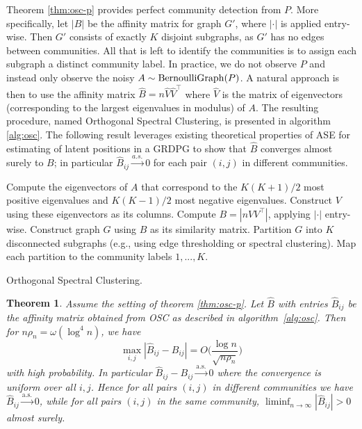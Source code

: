 \documentclass[
  11pt,
]{article}
\newtheorem{theorem}{Theorem}[section]
\theoremstyle{definition}
\theoremstyle{definition}
\theoremstyle{definition}
\theoremstyle{definition}
\theoremstyle{remark}
\begin{document}
Theorem \ref{thm:osc-p} provides perfect community detection from \(P\).
More specifically, let \(|B|\) be the affinity matrix for graph \(G'\),
where \(|\cdot|\) is applied entry-wise. Then
\(G'\) consists of exactly \(K\) disjoint subgraphs,
as \(G'\) has no edges between communities.
All that is left to identify the communities is
to assign each subgraph a distinct community label.
In practice, we do not observe \(P\) and instead only observe the noisy
\(A \sim \mathrm{BernoulliGraph}(P)\). A natural approach is then to use
the affinity matrix \(\hat{B} = n \hat{V} \hat{V}^{\top}\) where
\(\hat{V}\) is the matrix of eigenvectors (corresponding to the largest
eigenvalues in modulus) of \(A\). The resulting procedure, named
Orthogonal Spectral Clustering, is presented in
algorithm \ref{alg:osc}.
The following result leverages existing theoretical properties
of ASE for estimating of latent positions in a GRDPG \citep{rubindelanchy2017statistical} to show that
\(\hat{B}\) converges almost surely to \(B\); in particular
\(\hat{B}_{ij} \stackrel{a.s.}{\to} 0\)
for each pair \((i, j)\) in different communities.

\begin{algorithm}[tp]
  \label{alg:osc}
  \DontPrintSemicolon
  \SetAlgoLined
    Compute the eigenvectors of $A$ that correspond to the $K (K+1) / 2$ most
    positive eigenvalues and $K (K-1) / 2$ most negative eigenvalues. Construct
    $V$ using these eigenvectors as its columns.\;
    Compute $B = |n V V^\top|$, applying $|\cdot|$ entry-wise.\;
    Construct graph $G$ using $B$ as its similarity matrix.\;
    Partition $G$ into $K$ disconnected subgraphs
    (e.g., using edge thresholding or spectral clustering).\;
    Map each partition to the community labels $1, ..., K$.\;
  \caption{Orthogonal Spectral Clustering.}
\end{algorithm}

\begin{theorem}
\label{thm:osc}
Assume the setting of theorem \ref{thm:osc-p}. 
Let $\hat{B}$ with entries $\hat{B}_{ij}$ be the affinity matrix
obtained from OSC as described in algorithm~\ref{alg:osc}. 
Then for $n \rho_n = \omega(\log^{4}{n})$, we have
\begin{equation} 
\label{eq:osc}
\max_{i, j} |\hat{B}_{ij} - B_{ij}| = O\Big( \frac{\log n}{\sqrt{n \rho_n}} \Big)
\end{equation}
with high probability. In particular 
$\hat{B}_{ij} -B_{ij} \overset{\mathrm{a.s.}}{\rightarrow} 0$ 
where the convergence is
uniform over all $i,j$. Hence for all pairs $(i,j)$ in different
communities we have 
$\hat{B}_{ij} \overset{\mathrm{a.s.}}{\rightarrow} 0$, 
while for all pairs $(i, j)$ in the same community, 
$\liminf_{n \to \infty} |\hat{B}_{ij}| > 0$ almost surely. 
\end{theorem}
\end{document}
